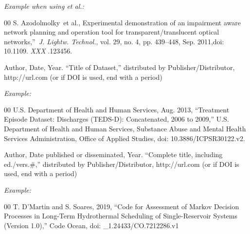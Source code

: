 \documentclass{ieeetj}
\begin{document}
{\it Example when using \textit{et al.}:}

\begin{thebibliography}{00}
 S. Azodolmolky~{{et al.}}, Experimental demonstration of an impairment aware network planning and operation tool for transparent/translucent optical networks,''~{\it J. Lightw. Technol.}, vol. 29, no. 4, pp. 439--448, Sep. 2011,doi:  {10.1109.} {{\it XXX}} {.123456}.
\end{thebibliography}


\noindent Author,  Date, Year. ``Title of Dataset,'' distributed by Publisher/Distributor, http://url.com (or if DOI is used, end with a period)

{\it Example:}

\begin{thebibliography}{00}
 U.S. Department of Health and Human Services, Aug. 2013, ``Treatment Episode Dataset: Discharges (TEDS-D): Concatenated, 2006 to 2009,'' U.S. Department of Health and Human Services, Substance Abuse and Mental Health Services Administration, Office of Applied Studies, doi: 10.3886/ICPSR30122.v2.
\end{thebibliography}


\noindent Author,  Date published or disseminated, Year. ``Complete title, including ed./vers.\#,'' distributed by Publisher/Distributor, http://url.com (or if DOI is used, end with a period)

{\it Example:}

\begin{thebibliography}{00}
 T. D'Martin and S. Soares, 2019, ``Code for Assessment of Markov Decision Processes in Long-Term Hydrothermal Scheduling of Single-Reservoir Systems (Version 1.0),'' Code Ocean, doi: \_1.24433/CO.7212286.v1
\end{thebibliography}
\end{document}
